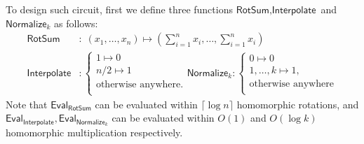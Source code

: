 \documentclass[runningheads]{llncs}
\newcommand{\eval}{\textsf{Eval}}
\begin{document}
    To design such circuit, first we define three functions $\textsf{RotSum},\textsf{Interpolate}$ and $\textsf{Normalize}_{k}$ as follows: 
        \begin{align*}
            \textsf{RotSum}&:\;(x_1,\dots,x_n) \mapsto \left(\sum_{i=1}^n x_i,\dots, \sum_{i=1}^n x_i\right)\\
            \textsf{Interpolate}&:\begin{cases}
            1\mapsto 0\\ n/2\mapsto 1\\ \text{otherwise anywhere.}\\    
            \end{cases}
            \textsf{Normalize}_k: \begin{cases}
                0\mapsto 0\\ 1,\dots,k \mapsto 1, \\ \text{otherwise anywhere}\\
            \end{cases}
        \end{align*}
    Note that $\eval_{\textsf{RotSum}}$ can be evaluated within $\lceil \log n \rceil$ homomorphic rotations, and $\eval_\textsf{Interpolate}, \eval_{\textsf{Normalize}_k}$ can be evaluated within $O(1)$ and $O(\log k)$ homomorphic multiplication respectively. 
    
\end{document}
